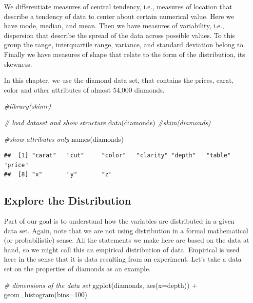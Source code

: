 \documentclass[
]{book}
\newenvironment{Shaded}{\begin{snugshade}}{\end{snugshade}}
\newcommand{\AttributeTok}[1]{\textcolor[rgb]{0.77,0.63,0.00}{#1}}
\newcommand{\CommentTok}[1]{\textcolor[rgb]{0.56,0.35,0.01}{\textit{#1}}}
\newcommand{\DecValTok}[1]{\textcolor[rgb]{0.00,0.00,0.81}{#1}}
\newcommand{\FunctionTok}[1]{\textcolor[rgb]{0.00,0.00,0.00}{#1}}
\newcommand{\NormalTok}[1]{#1}
\newcommand{\SpecialCharTok}[1]{\textcolor[rgb]{0.00,0.00,0.00}{#1}}
\begin{document}
We differentiate measures of central tendency, i.e., measures of location that describe a tendency of data to center about certain numerical value. Here we have mode, median, and mean. Then we have measures of variability, i.e., dispersion that describe the spread of the data across possible values. To this group the range, interquartile range, variance, and standard deviation belong to. Finally we have measures of shape that relate to the form of the distribution, its skewness.

In this chapter, we use the diamond data set, that contains the prices, carat, color and other attributes of almost 54,000 diamonds.

\begin{Shaded}
\begin{Highlighting}[]
\CommentTok{\#library(skimr)}

\CommentTok{\# load dataset and show structure}
\FunctionTok{data}\NormalTok{(diamonds)}
\CommentTok{\#skim(diamonds)}

\CommentTok{\#show attributes only}
\FunctionTok{names}\NormalTok{(diamonds)}
\end{Highlighting}
\end{Shaded}

\begin{verbatim}
##  [1] "carat"   "cut"     "color"   "clarity" "depth"   "table"   "price"  
##  [8] "x"       "y"       "z"
\end{verbatim}

\hypertarget{explore-the-distribution}{%
\subsection{Explore the Distribution}\label{explore-the-distribution}}

Part of our goal is to understand how the variables are distributed in a given data set. Again, note that we are not using distribution in a formal mathematical (or probabilistic) sense. All the statements we make here are based on the data at hand, so we might call this an empirical distribution of data. Empirical is used here in the sense that it is data resulting from an experiment. Let's take a data set on the properties of diamonds as an example.

\begin{Shaded}
\begin{Highlighting}[]
\CommentTok{\# dimensions of the data set}
\FunctionTok{ggplot}\NormalTok{(diamonds, }\FunctionTok{aes}\NormalTok{(}\AttributeTok{x=}\NormalTok{depth)) }\SpecialCharTok{+} \FunctionTok{geom\_histogram}\NormalTok{(}\AttributeTok{bins=}\DecValTok{100}\NormalTok{)}
\end{Highlighting}
\end{Shaded}
\end{document}
